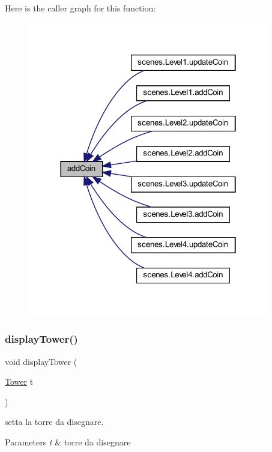 Here is the caller graph for this function\+:\nopagebreak
\begin{figure}[H]
\begin{center}
\leavevmode
\includegraphics[width=298pt]{classui_1_1_action_bar_a8e9e4227428708da489e0b37223377a8_icgraph}
\end{center}
\end{figure}
\mbox{\label{classui_1_1_action_bar_aacab7287bc123d863feb4551df131934}} 
\subsubsection{\texorpdfstring{display\+Tower()}{displayTower()}}
{\footnotesize\ttfamily void display\+Tower (\begin{DoxyParamCaption}\item[{\hyperlink{classtowers_1_1_tower}{Tower}}]{t }\end{DoxyParamCaption})}



setta la torre da disegnare. 


\begin{DoxyParams}{Parameters}
{\em t} & torre da disegnare \\
\hline
\end{DoxyParams}


